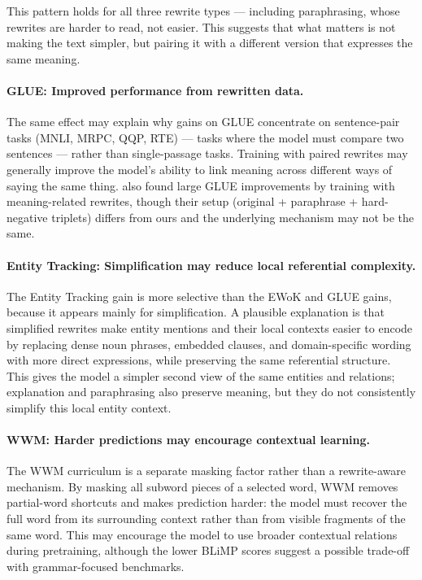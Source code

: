 \documentclass[11pt]{article}
\begin{document}
This pattern holds for all three rewrite types --- including paraphrasing, whose rewrites are harder to read, not easier. This suggests that what matters is not making the text simpler, but pairing it with a different version that expresses the same meaning.

\paragraph{GLUE: Improved performance from rewritten data.} The same effect may explain why gains on GLUE concentrate on sentence-pair tasks (MNLI, MRPC, QQP, RTE) --- tasks where the model must compare two sentences --- rather than single-passage tasks. Training with paired rewrites may generally improve the model's ability to link meaning across different ways of saying the same thing. \citet{edman2024babylms} also found large GLUE improvements by training with meaning-related rewrites, though their setup (original + paraphrase + hard-negative triplets) differs from ours and the underlying mechanism may not be the same.

\paragraph{Entity Tracking: Simplification may reduce local referential complexity.} The Entity Tracking gain is more selective than the EWoK and GLUE gains, because it appears mainly for simplification. A plausible explanation is that simplified rewrites make entity mentions and their local contexts easier to encode by replacing dense noun phrases, embedded clauses, and domain-specific wording with more direct expressions, while preserving the same referential structure. This gives the model a simpler second view of the same entities and relations; explanation and paraphrasing also preserve meaning, but they do not consistently simplify this local entity context.


\paragraph{WWM: Harder predictions may encourage contextual learning.} The WWM curriculum is a separate masking factor rather than a rewrite-aware mechanism. By masking all subword pieces of a selected word, WWM removes partial-word shortcuts and makes prediction harder: the model must recover the full word from its surrounding context rather than from visible fragments of the same word. This may encourage the model to use broader contextual relations during pretraining, although the lower BLiMP scores suggest a possible trade-off with grammar-focused benchmarks.
\end{document}
